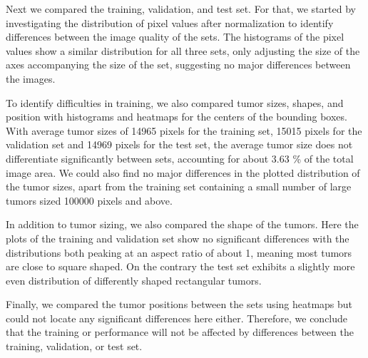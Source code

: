 \documentclass[lettersize,journal]{IEEEtran}
\begin{document}
Next we compared the training, validation, and test set. For that, we started by investigating the distribution of pixel values after normalization to identify differences between the image quality of the sets. The histograms of the pixel values %
show a similar distribution for all three sets, only adjusting the size of the axes accompanying the size of the set, suggesting no major differences between the images.


To identify difficulties in training, we also compared tumor sizes, shapes, and position with histograms and heatmaps for the centers of the bounding boxes. With average tumor sizes of 14965 pixels for the training set, 15015 pixels for the validation set and 14969 pixels for the test set, the average tumor size does not differentiate significantly between sets, accounting for about 3.63 \% of the total image area. We could also find no major differences in the plotted distribution of the tumor sizes, apart from the training set containing a small number of large tumors sized 100000 pixels and above.

In addition to tumor sizing, we also compared the shape of the tumors. Here the plots of the training and validation set show no significant differences with the distributions both peaking at an aspect ratio of about 1, meaning most tumors are close to square shaped. On the contrary the test set exhibits a slightly more even distribution of differently shaped rectangular tumors.

Finally, we compared the tumor positions between the sets using heatmaps but could not locate any significant differences here either. Therefore, we conclude that the training or performance will not be affected by differences between the training, validation, or test set. 
\end{document}
